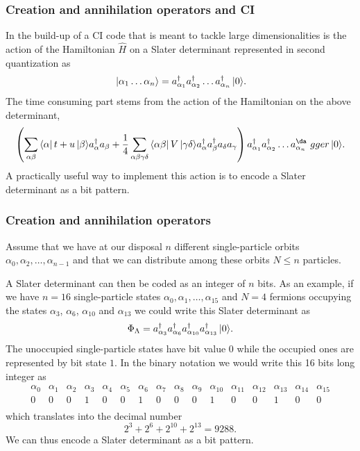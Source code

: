 \frame
{
  \frametitle{Creation and annihilation operators and CI }
\begin{small}
{\scriptsize
In the build-up of a CI code that is meant to tackle large dimensionalities
is the action of the Hamiltonian $\hat{H}$ on a
Slater determinant represented in second quantization as
\[
\,|{\alpha_1\dots \alpha_n}\rangle = a_{\alpha_1}^\dagger a_{\alpha_2}^\dagger \dots a_{\alpha_n}^\dagger \,|{0}\rangle.
\]
The time consuming part stems from the action of the Hamiltonian
on the above determinant,
\[
\left(\sum_{\alpha\beta} \element{\alpha}{t+u}{\beta} a_\alpha^\dagger a_\beta + \frac{1}{4} \sum_{\alpha\beta\gamma\delta}
                \element{\alpha \beta}{V}{\gamma \delta} a_\alpha^\dagger a_\beta^\dagger a_\delta a_\gamma\right)a_{\alpha_1}^\dagger a_{\alpha_2}^\dagger \dots a_{\alpha_n}^\da\
gger \ket{0}.
\]
A practically useful way to implement this action is to encode a Slater determinant as a bit pattern.
}
\end{small}
}

\frame
{
  \frametitle{Creation and annihilation operators}
\begin{small}
{\scriptsize
Assume that we have at our disposal $n$ different single-particle orbits
$\alpha_0,\alpha_2,\dots,\alpha_{n-1}$ and that we can distribute  among these orbits $N\le n$ particles.

A Slater  determinant can then be coded as an integer of $n$ bits. As an example, if we have $n=16$ single-particle states
$\alpha_0,\alpha_1,\dots,\alpha_{15}$ and $N=4$ fermions occupying the states $\alpha_3$, $\alpha_6$, $\alpha_{10}$ and $\alpha_{13}$
we could write this Slater determinant as  
\[
\Phi_{\Lambda} = a_{\alpha_3}^\dagger a_{\alpha_6}^\dagger a_{\alpha_{10}}^\dagger a_{\alpha_{13}}^\dagger \,|{0}\rangle.
\]
The unoccupied single-particle states have bit value $0$ while the occupied ones are represented by bit state $1$. 
In the binary notation we would write this   16 bits long integer as
\[
\begin{array}{cccccccccccccccc}
{\alpha_0}&{\alpha_1}&{\alpha_2}&{\alpha_3}&{\alpha_4}&{\alpha_5}&{\alpha_6}&{\alpha_7} & {\alpha_8} &{\alpha_9} & {\alpha_{10}} &{\alpha_{11}} &{\alpha_{12}} &{\alpha_{13}} &{\alpha_{14}} & {\alpha_{15}} \\
{0} & {0} &{0} &{1} &{0} &{0} &{1} &{0} &{0} &{0} &{1} &{0} &{0} &{1} &{0} & {0} \\
\end{array}
\]
which translates into the decimal number
\[
2^3+2^6+2^{10}+2^{13}=9288.
\]
We can thus encode a Slater determinant as a bit pattern.
}
\end{small}
}

